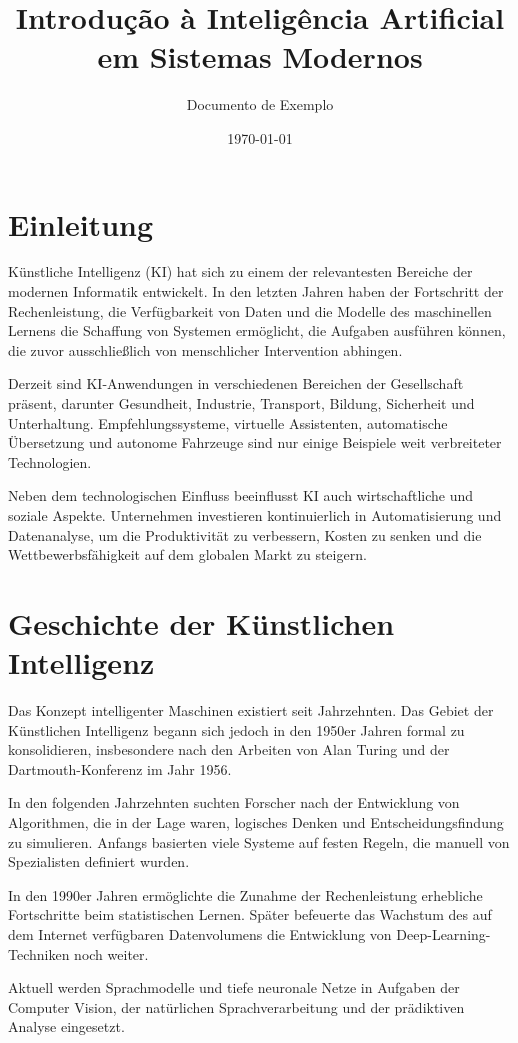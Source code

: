 \documentclass[11pt]{article}
\title{Introdução à Inteligência Artificial em Sistemas Modernos}
\author{Documento de Exemplo}
\date{\today}
\begin{document}
\section{Einleitung}

Künstliche Intelligenz (KI) hat sich zu einem der relevantesten Bereiche der modernen Informatik entwickelt.
In den letzten Jahren haben der Fortschritt der Rechenleistung, die Verfügbarkeit von Daten und die Modelle
des maschinellen Lernens die Schaffung von Systemen ermöglicht, die Aufgaben ausführen können, die
zuvor ausschließlich von menschlicher Intervention abhingen.

Derzeit sind KI-Anwendungen in verschiedenen Bereichen der Gesellschaft präsent, darunter Gesundheit,
Industrie, Transport, Bildung, Sicherheit und Unterhaltung. Empfehlungssysteme,
virtuelle Assistenten, automatische Übersetzung und autonome Fahrzeuge sind nur einige Beispiele
weit verbreiteter Technologien.

Neben dem technologischen Einfluss beeinflusst KI auch wirtschaftliche und soziale Aspekte. Unternehmen
investieren kontinuierlich in Automatisierung und Datenanalyse, um die Produktivität zu verbessern,
Kosten zu senken und die Wettbewerbsfähigkeit auf dem globalen Markt zu steigern. 

\section{Geschichte der Künstlichen Intelligenz}

Das Konzept intelligenter Maschinen existiert seit Jahrzehnten. Das Gebiet der Künstlichen
Intelligenz begann sich jedoch in den 1950er Jahren formal zu konsolidieren, insbesondere nach den
Arbeiten von Alan Turing und der Dartmouth-Konferenz im Jahr 1956.

In den folgenden Jahrzehnten suchten Forscher nach der Entwicklung von Algorithmen, die in der Lage waren,
logisches Denken und Entscheidungsfindung zu simulieren. Anfangs basierten viele Systeme auf
festen Regeln, die manuell von Spezialisten definiert wurden.

In den 1990er Jahren ermöglichte die Zunahme der Rechenleistung erhebliche Fortschritte beim
statistischen Lernen. Später befeuerte das Wachstum des auf dem Internet verfügbaren Datenvolumens
die Entwicklung von Deep-Learning-Techniken noch weiter.

Aktuell werden Sprachmodelle und tiefe neuronale Netze in Aufgaben der Computer Vision,
der natürlichen Sprachverarbeitung und der prädiktiven Analyse eingesetzt.
 
\end{document}

